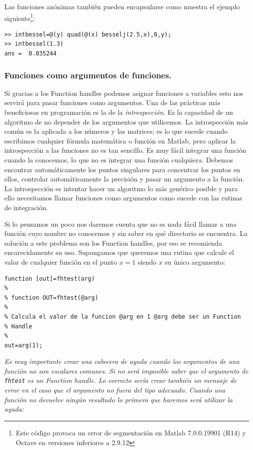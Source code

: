 Las funciones anónimas también pueden encapsularse como muestra el
ejemplo siguiente\footnote{Este código provoca un error de segmentación
en Matlab 7.0.0.19901 (R14) y Octave en versiones inferiores a
2.9.12}:

\begin{lstlisting}
>> intbessel=@(y) quad(@(x) besselj(2.5,x),0,y);
>> intbessel(1.3)
ans =  0.035244
\end{lstlisting}


\subsubsection{Funciones como argumentos de funciones.}

Si gracias a los Function handles podemos asignar funciones a
variables esto nos servirá para pasar funciones como argumentos. Una
de las prácticas más beneficiosas en programación es la de la
\emph{introspección}.  Es la capacidad de un
algoritmo de no depender de los argumentos que utilicemos. La
introspección más común es la aplicada a los números y las matrices;
es lo que sucede cuando escribimos cualquier fórmula matemática o
función en Matlab, pero aplicar la introspección a las funciones no es
tan sencillo. Es muy fácil integrar una función cuando la conocemos,
lo que no es integrar una función cualquiera. Debemos encontrar
automáticamente los puntos singulares para concentrar los puntos en
ellos, controlar automáticamente la precisión y pasar un argumento a
la función. La introspección es intentar hacer un algoritmo lo más
genérico posible y para ello necesitamos llamar funciones como
argumentos como sucede con las rutinas de integración.

Si lo pensamos un poco nos daremos cuenta que no es nada fácil llamar
a una función cuyo nombre no conocemos y sin saber en qué directorio
se encuentra. La solución a este problema son los Function handles,
por eso se recomienda encarecidamente su uso. Supongamos que queremos
una rutina que calcule el valor de cualquier función en el punto $x=1$
siendo $x$ su único argumento:

\begin{lstlisting}
function [out]=fhtest(arg)
%
% function OUT=fhtest(@arg)
%
% Calcula el valor de la funcion @arg en 1 @arg debe ser un Function
% Handle
%
out=arg(1);
\end{lstlisting}
\emph{Es muy importante crear una cabecera de ayuda cuando los
  argumentos de una función no son escalares comunes. Si no será
  imposible saber que el argumento de} \texttt{\emph{fhtest}} \emph{es
  un Function handle.  Lo correcto sería crear también un mensaje de
  error en el caso que el argumento no fuera del tipo adecuado. Cuando
  una función no devuelve ningún resultado lo primero que haremos será
  utilizar la ayuda:}

